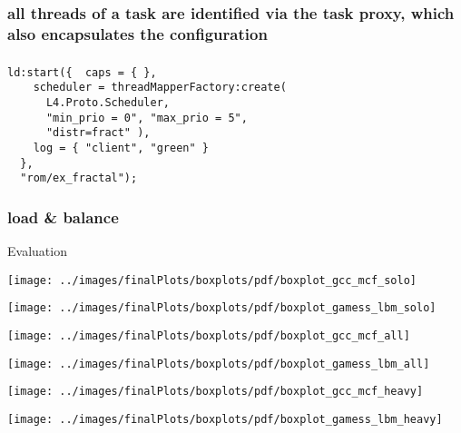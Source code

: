 \documentclass[utf8,10pt]{beamer}
\begin{document}
\begin{frame}
  \frametitle{}
  \centering
  
\end{frame}

\begin{frame}
  \frametitle{all threads of a task are identified via the task proxy, which
  also encapsulates the configuration }
  \centering
  
\end{frame}

\begin{frame}[fragile]
  \frametitle{}
  \centering
  \begin{minipage}[c]{\columnwidth}
    \begin{verbatim}
ld:start({  caps = { },
    scheduler = threadMapperFactory:create(
      L4.Proto.Scheduler,
      "min_prio = 0", "max_prio = 5",
      "distr=fract" ),
    log = { "client", "green" }
  },
  "rom/ex_fractal");
    \end{verbatim}
  \end{minipage}
\end{frame}

\begin{frame}
  \frametitle{load \& balance}
\end{frame}

\begin{frame}
  \centering
  \Large
  Evaluation
\end{frame}

\begin{frame}
  \centering
    \texttt{[image: ../images/finalPlots/boxplots/pdf/boxplot\_gcc\_mcf\_solo]}

    \texttt{[image: ../images/finalPlots/boxplots/pdf/boxplot\_gamess\_lbm\_solo]}
\end{frame}

\begin{frame}
  \centering
    \texttt{[image: ../images/finalPlots/boxplots/pdf/boxplot\_gcc\_mcf\_all]}

    \texttt{[image: ../images/finalPlots/boxplots/pdf/boxplot\_gamess\_lbm\_all]}
\end{frame}


\begin{frame}
  \centering
    \texttt{[image: ../images/finalPlots/boxplots/pdf/boxplot\_gcc\_mcf\_heavy]}

    \texttt{[image: ../images/finalPlots/boxplots/pdf/boxplot\_gamess\_lbm\_heavy]}
\end{frame}
\end{document}
